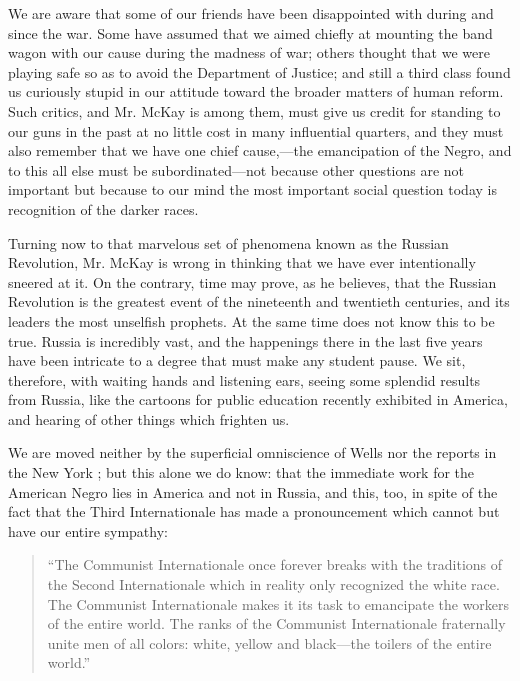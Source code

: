 \documentclass[letterpaper,10pt,english]{jupyterBook}
\begin{document}
\sphinxAtStartPar
We are aware that some of our friends have been disappointed with  during and since the war. Some have assumed that we aimed chiefly at mounting the band wagon with our cause during the madness of war; others thought that we were playing safe so as to avoid the Department of Justice; and still a third class found us curiously stupid in our attitude toward the broader matters of human reform. Such critics, and Mr. McKay is among them, must give us credit for standing to our guns in the past at no little cost in many influential quarters, and they must also remember that we have one chief cause,—the emancipation of the Negro, and to this all else must be subordinated—not because other questions are not important but because to our mind the most important social question today is recognition of the darker races.

\sphinxAtStartPar
Turning now to that marvelous set of phenomena known as the Russian Revolution, Mr. McKay is wrong in thinking that we have ever intentionally sneered at it. On the contrary, time may prove, as he believes, that the Russian Revolution is the greatest event of the nineteenth and twentieth centuries, and its leaders the most unselfish prophets. At the same time  does not know this to be true. Russia is incredibly vast, and the happenings there in the last five years have been intricate to a degree that must make any student pause. We sit, therefore, with waiting hands and listening ears, seeing some splendid results from Russia, like the cartoons for public education recently exhibited in America, and hearing of other things which frighten us.

\sphinxAtStartPar
We are moved neither by the superficial omniscience of Wells nor the reports in the New York ; but this alone we do know: that the immediate work for the American Negro lies in America and not in Russia, and this, too, in spite of the fact that the Third Internationale has made a pronouncement which cannot but have our entire sympathy:
\begin{quote}

\sphinxAtStartPar
“The Communist Internationale once forever breaks with the traditions of the Second Internationale which in reality only recognized the white race. The Communist Internationale makes it its task to emancipate the workers of the entire world. The ranks of the Communist Internationale fraternally unite men of all colors: white, yellow and black—the toilers of the entire world.”
\end{quote}
\end{document}
